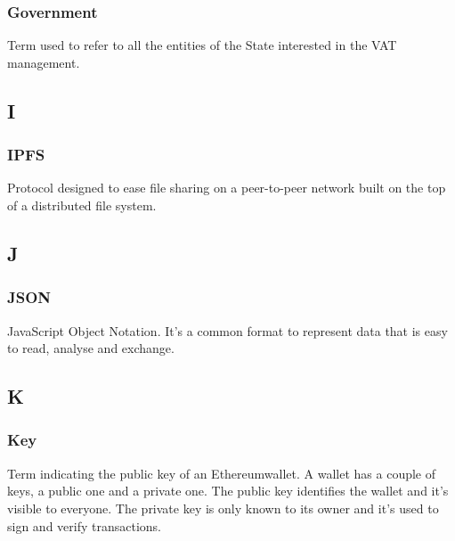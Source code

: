 
\subsubsection*{Government}
Term used to refer to all the entities of the State interested in the VAT management.



\subsection*{I}

\subsubsection*{IPFS}
Protocol designed to ease file sharing on a peer-to-peer network built on the top of a distributed file system.
\subsection*{J}

\subsubsection*{JSON}
JavaScript Object Notation. It's a common format to represent data that is easy to read, analyse and exchange.



\subsection*{K}

\subsubsection*{Key}
Term indicating the public key of an Ethereum\glosp wallet\glosp. A wallet has a couple of keys, a public one and a private one. The public key identifies the wallet and it's visible to everyone. The private key is only known to its owner and it's used to sign and verify transactions.


